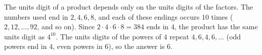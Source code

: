 The units digit of a product depends only on the units digits of the factors. The numbers used end in $2,4,6,8$, and each of these endings occurs $10$ times ($2,12,\dots,92$, and so on). Since $2\cdot4\cdot6\cdot8=384$ ends in $4$, the product has the same units digit as $4^{10}$. The units digits of the powers of $4$ repeat $4,6,4,6,\dots$ (odd powers end in $4$, even powers in $6$), so the answer is $\boxed{6}$.

